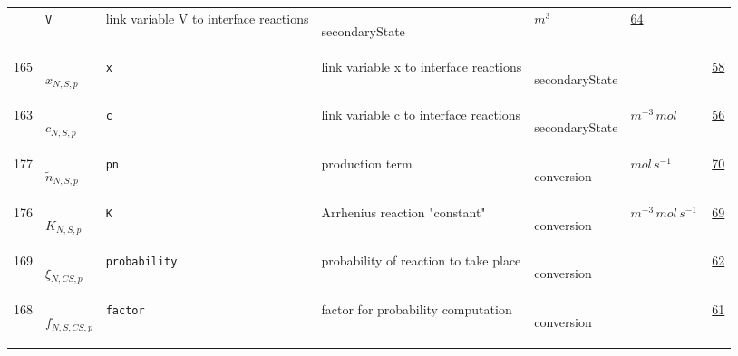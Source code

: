 \begin{longtable}{|p{1cm}|p{2.5cm}|p{4.5cm}|p{8cm}|p{3.0cm}|p{3cm}|p{1cm}|}
             & \verb|V|
             & link variable  V to interface reactions
             & \begin{lay}secondaryState \end{lay}
             & $ m^{3} \, $
             &                 \hyperlink{"e:64"}{ 64 }
                 \\
            165
             & \hypertarget{"v:165"}{ $ {x}{_{N, S, p}} $}
             & \verb|x|
             & link variable  x to interface reactions
             & \begin{lay}secondaryState \end{lay}
             & $  $
             &                 \hyperlink{"e:58"}{ 58 }
                 \\
            163
             & \hypertarget{"v:163"}{ $ {c}{_{N, S, p}} $}
             & \verb|c|
             & link variable  c to interface reactions
             & \begin{lay}secondaryState \end{lay}
             & $ m^{-3} \,mol \, $
             &                 \hyperlink{"e:56"}{ 56 }
                 \\
            177
             & \hypertarget{"v:177"}{ $ {{\tilde{n}}}{_{N, S, p}} $}
             & \verb|pn|
             & production term
             & \begin{lay}conversion \end{lay}
             & $ mol \,s^{-1} \, $
             &                 \hyperlink{"e:70"}{ 70 }
                 \\
            176
             & \hypertarget{"v:176"}{ $ {K}{_{N, S, p}} $}
             & \verb|K|
             & Arrhenius reaction "constant"
             & \begin{lay}conversion \end{lay}
             & $ m^{-3} \,mol \,s^{-1} \, $
             &                 \hyperlink{"e:69"}{ 69 }
                 \\
            169
             & \hypertarget{"v:169"}{ $ {\xi}{_{N, CS, p}} $}
             & \verb|probability|
             & probability of reaction to take place
             & \begin{lay}conversion \end{lay}
             & $  $
             &                 \hyperlink{"e:62"}{ 62 }
                 \\
            168
             & \hypertarget{"v:168"}{ $ {f}{_{N, S, CS, p}} $}
             & \verb|factor|
             & factor for probability computation
             & \begin{lay}conversion \end{lay}
             & $  $
             &                 \hyperlink{"e:61"}{ 61 }
                 \\
    \end{longtable}